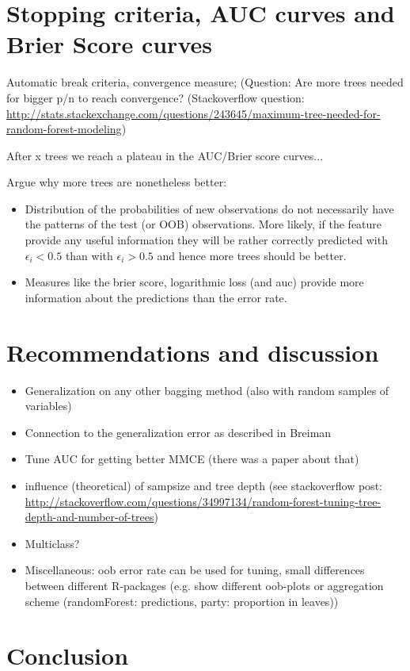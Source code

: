 \documentclass[paper=a4
               ,12pt
               ,DIV=12
               ,parskip=half
               ,titlepage=on
               ,headinclude 
               ,footinclude
               ,headsepline
               ,footsepline         %
               ,ilines 
               ]{scrartcl}
\begin{document}
\section{Stopping criteria, AUC curves and Brier Score curves}
Automatic break criteria, convergence measure; (Question: Are more trees needed for bigger p/n to reach convergence? (Stackoverflow question: \url{http://stats.stackexchange.com/questions/243645/maximum-tree-needed-for-random-forest-modeling})

After x trees we reach a plateau in the AUC/Brier score curves...

Argue why more trees are nonetheless better: 
\begin{itemize}
\item Distribution of the probabilities of new observations do not necessarily have the patterns of the test (or OOB) observations. 
More likely, if the feature provide any useful information they will be rather correctly predicted with $\epsilon_i < 0.5$ than with $\epsilon_i > 0.5$ and hence more trees should be better. 
\item Measures like the brier score, logarithmic loss (and auc) provide more information about the predictions than the error rate.
\end{itemize}


\section{Recommendations and discussion}
\label{sec:discussion}

\begin{itemize}
 \item Generalization on any other bagging method (also with random samples of variables)
 \item Connection to the generalization error as described in Breiman
 \item Tune AUC for getting better MMCE (there was a paper about that)
 \item influence (theoretical) of sampsize and tree depth (see stackoverflow post: \url{http://stackoverflow.com/questions/34997134/random-forest-tuning-tree-depth-and-number-of-trees})
 \item Multiclass?
 \item Miscellaneous: oob error rate can be used for tuning, small differences between different R-packages (e.g. show different oob-plots or aggregation scheme (randomForest: predictions, party: proportion in leaves))
\end{itemize}

\section{Conclusion}


\end{document}
